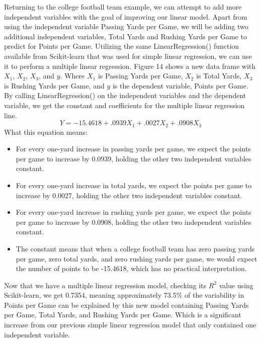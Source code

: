 \documentclass[a4paper,12pt]{report}
\begin{document}
Returning to the college football team example, we can attempt to add more independent variables with the goal of improving our linear model. Apart from using the independent variable Passing Yards per Game, we will be adding two additional independent variables, Total Yards and Rushing Yards per Game to predict for Points per Game. Utilizing the same LinearRegression() function available from Scikit-learn that was used for simple linear regression, we can use it to perform a multiple linear regression. Figure 14 shows a new data frame with $X_1$, $X_2$, $X_3$, and $y$. Where $X_1$ is Passing Yards per Game, $X_2$ is Total Yards, $X_3$ is Rushing Yards per Game, and $y$ is the dependent variable, Points per Game. By calling LinearRegression() on the independent variables and the dependent variable, we get the constant and coefficients for the multiple linear regression line.
$$Y=-15.4618+.0939X_1+.0027X_2+.0908X_3$$
What this equation means:
\begin{itemize}[,]
    \setlength\itemsep{-.1cm}
    \item For every one-yard increase in passing yards per game, we expect the points per game to increase by 0.0939, holding the other two independent variables constant.
    \item For every one-yard increase in total yards, we expect the points per game to increase by 0.0027, holding the other two independent variables constant.
    \item For every one-yard increase in rushing yards per game, we expect the points per game to increase by 0.0908, holding the other two independent variables constant.
    \item The constant means that when a college football team has zero passing yards per game, zero total yards, and zero rushing yards per game, we would expect the number of points to be -15.4618, which has no practical interpretation. 
\end{itemize}

Now that we have a multiple linear regression model, checking its $R^2$ value using Scikit-learn, we get 0.7354, meaning approximately 73.5\% of the variability in Points per Game can be explained by this new model containing Passing Yards per Game, Total Yards, and Rushing Yards per Game. Which is a significant increase from our previous simple linear regression model that only contained one independent variable. 
\end{document}
